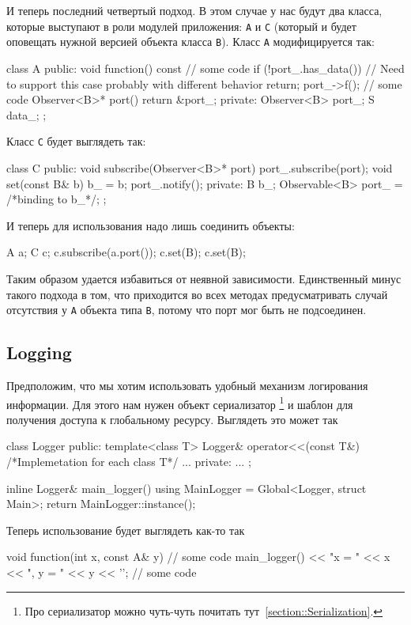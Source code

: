 И теперь последний четвертый подход.
В этом случае у нас будут два класса, которые выступают в роли модулей приложения: \verb"A" и \verb"C" (который и будет оповещать нужной версией объекта класса \verb"B").
Класс \verb"A" модифицируется так:
\begin{cppcode}
class A {
public:
  void function() const {
    // some code
    if (!port_.has_data()) // Need to support this case probably with different behavior
      return;
    port_->f();
    // some code
  }
  Observer<B>* port() {
    return &port_;
  }
private:
  Observer<B> port_;
  S data_;
};
\end{cppcode}
Класс \verb"C" будет выглядеть так:
\begin{cppcode}
class C {
public:
  void subscribe(Observer<B>* port) {
    port_.subscribe(port);
  }
  void set(const B& b) {
    b_ = b;
    port_.notify();
  }
private:
  B b_;
  Observable<B> port_ = /*binding to b_*/;
};
\end{cppcode}
И теперь для использования надо лишь соединить объекты:
\begin{cppcode}
A a;
C c;
c.subscribe(a.port());
c.set(B{});
c.set(B{});
\end{cppcode}
Таким образом удается избавиться от неявной зависимости.
Единственный минус такого подхода в том, что приходится во всех методах предусматривать случай отсутствия у \verb"A" объекта типа \verb"B", потому что порт мог быть не подсоединен.

\subsection{Logging}
\label{section::Logging}

Предположим, что мы хотим использовать удобный механизм логирования информации.
Для этого нам нужен объект сериализатор%
\footnote{Про сериализатор можно чуть-чуть почитать тут~\ref{section::Serialization}.}
и шаблон для получения доступа к глобальному ресурсу.
Выглядеть это может так
\begin{cppcode}
class Logger {
public:
   template<class T>
   Logger& operator<<(const T&) {
     /*Implemetation for each class T*/
   }
   ...
private:
  ...
};

inline Logger& main_logger() {
  using MainLogger = Global<Logger, struct Main>;
  return MainLogger::instance();
}
\end{cppcode}
Теперь использование будет выглядеть как-то так
\begin{cppcode}
void function(int x, const A& y) {
  // some code
  main_logger() << "x = " << x << ", y = " << y << '\n';
  // some code
}
\end{cppcode}

